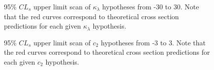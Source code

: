 \begin{figure}[!htbp]
  \setcounter{subfigure}{0}
  \centering
  \qquad
  \caption{95\% $CL_{s}$ upper limit scan of $\kappa_{\lambda}$ hypotheses from -30 to 30. Note that the red curves correspond to theoretical cross section predictions for each given $\kappa_{\lambda}$ hypothesis.}
  \label{fig:kl_scan}
\end{figure}

\begin{figure}[!htbp]
  \setcounter{subfigure}{0}
  \centering
  \qquad
  \caption{95\% $CL_{s}$ upper limit scan of $c_{2}$ hypotheses from -3 to 3. Note that the red curves correspond to theoretical cross section predictions for each given $c_{2}$ hypothesis.}
  \label{fig:c2_scan}
\end{figure}

